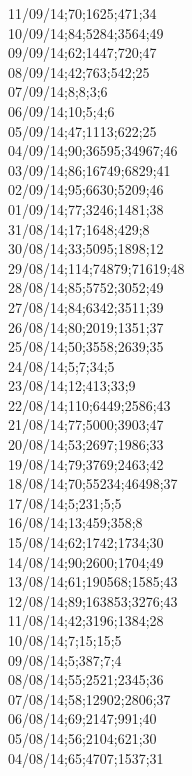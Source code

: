 11/09/14;70;1625;471;34 \\
10/09/14;84;5284;3564;49 \\
09/09/14;62;1447;720;47 \\
08/09/14;42;763;542;25 \\
07/09/14;8;8;3;6 \\
06/09/14;10;5;4;6 \\
05/09/14;47;1113;622;25 \\
04/09/14;90;36595;34967;46 \\
03/09/14;86;16749;6829;41 \\
02/09/14;95;6630;5209;46 \\
01/09/14;77;3246;1481;38 \\
31/08/14;17;1648;429;8 \\
30/08/14;33;5095;1898;12 \\
29/08/14;114;74879;71619;48 \\
28/08/14;85;5752;3052;49 \\
27/08/14;84;6342;3511;39 \\
26/08/14;80;2019;1351;37 \\
25/08/14;50;3558;2639;35 \\
24/08/14;5;7;34;5 \\
23/08/14;12;413;33;9 \\
22/08/14;110;6449;2586;43 \\
21/08/14;77;5000;3903;47 \\
20/08/14;53;2697;1986;33 \\
19/08/14;79;3769;2463;42 \\
18/08/14;70;55234;46498;37 \\
17/08/14;5;231;5;5 \\
16/08/14;13;459;358;8 \\
15/08/14;62;1742;1734;30 \\
14/08/14;90;2600;1704;49 \\
13/08/14;61;190568;1585;43 \\
12/08/14;89;163853;3276;43 \\
11/08/14;42;3196;1384;28 \\
10/08/14;7;15;15;5 \\
09/08/14;5;387;7;4 \\
08/08/14;55;2521;2345;36 \\
07/08/14;58;12902;2806;37 \\
06/08/14;69;2147;991;40 \\
05/08/14;56;2104;621;30 \\
04/08/14;65;4707;1537;31 \\
